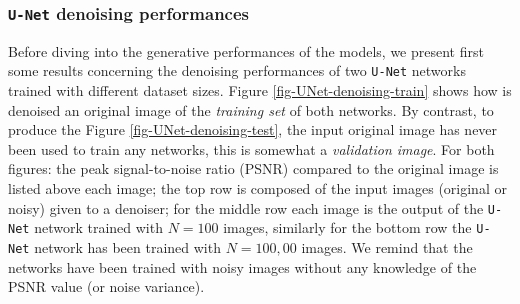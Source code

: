 \documentclass[11pt]{amsart}
\begin{document}
\subsubsection{\texttt{U-Net} denoising performances}
Before diving into the generative performances of the models, we present first some results concerning the denoising performances of two \texttt{U-Net} networks trained with different dataset sizes. Figure \ref{fig-UNet-denoising-train} shows how is denoised an original image of the \textit{training set} of both networks. By contrast, to produce the Figure \ref{fig-UNet-denoising-test}, the input original image has never been used to train any networks, this is somewhat a \textit{validation image}. For both figures: the peak signal-to-noise ratio (PSNR) compared to the original image is listed above each image; the top row is composed of the input images (original or noisy) given to a denoiser; for the middle row each image is the output of the \texttt{U-Net} network trained with $N=100$ images, similarly for the bottom row the \texttt{U-Net} network has been trained with $N=100,00$ images. We remind that the networks have been trained with noisy images without any knowledge of the PSNR value (or noise variance). 
\end{document}

